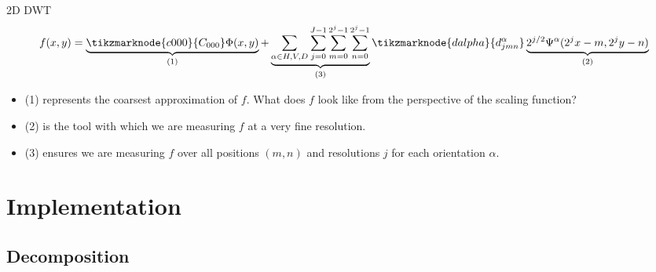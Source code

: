 \documentclass[9pt]{beamer}
\begin{document}
\begin{frame}{2D DWT}
	\begin{equation*}
        f(x,y) = \underbrace{\tikzmarknode{c000}{C_{000}}\Phi(x,y)}_{(1)} 
    	+ \underbrace{\sum_{\alpha \in {H, V, D}} \sum_{j=0}^{J-1} \sum_{m=0}^{2^j-1} \sum_{n=0}^{2^j-1}}_{(3)} \tikzmarknode{dalpha}{d^\alpha_{jmn}} \underbrace{2^{j/2} \Psi^\alpha(2^jx-m, 2^jy-n)}_{(2)}
	\end{equation*}
    \vspace{1cm}
    \begin{itemize}
        \item[] (1) represents the coarsest approximation of $f$. What does $f$ look like from the perspective of the scaling function?
        \item[] (2) is the tool with which we are measuring $f$ at a very fine resolution.
        \item[] (3) ensures we are measuring $f$ over all positions $(m,n)$ and resolutions $j$ for each orientation $\alpha$.
    \end{itemize}
\end{frame}

\section{Implementation}



\subsection{Decomposition}
\end{document}
